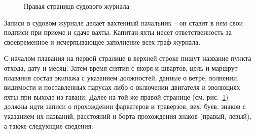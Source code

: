 \documentclass[a4paper, 12pt, twoside, final, book, russian, fittopage, cyremdash]{ncc}
\newcommand{\ris}[1]{\ref{fig:#1}}
\begin{document}
\begin{figure}[htb]
\begin{minipage}{0.49\textwidth}
    \caption{Правая страницв судового журнала}
    \label{fig:j-page-4}
  \end{minipage}
\end{figure} 

Записи в судовом журнале делает вахтенный начальник \--- он ставит в нем свои подписи при приеме и сдаче вахты. Капитан яхты несет ответственность за своевременное и исчерпывающее заполнение всех граф журнала.
 
С началом плавания на первой странице в верхней строке пишут название пункта отхода, дату и месяц. Затем время снятия с якоря и швартов, цель и маршрут плавания состав экипажа с указанием должностей, данные о ветре, волнении, видимости и поставленных парусах либо о включении двигателя и эволюциях яхты при выходе из гавани. Далее на той же правой странице (см. рис.~\ris{j-page-4}) должны идти записи о прохождении фарватеров и траверзов, вех, буев, знаков с указанием их названий, расстояний и борта прохождения знаков (правый, левый), а также следующие сведения:
\end{document}

